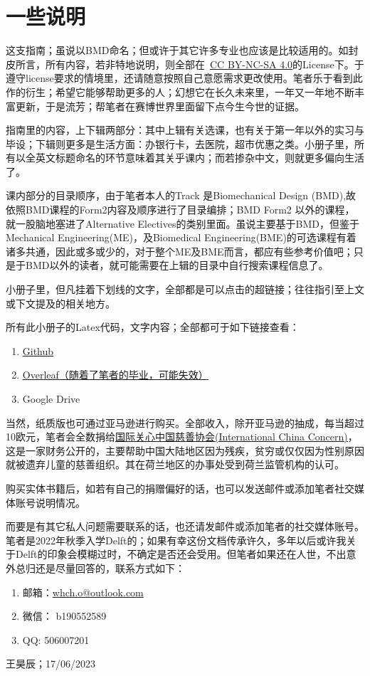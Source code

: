 \section{一些说明}
这支指南；虽说以BMD命名；但或许于其它许多专业也应该是比较适用的。如封皮所言，所有内容，若非特地说明，则全部在\ccbyncsa\ \href{http://creativecommons.org/licenses/by-nc-sa/4.0/}{\uline{CC BY-NC-SA 4.0}}的License下。于遵守license要求的情境里，还请随意按照自己意愿需求更改使用。笔者乐于看到此作的衍生；希望它能够帮助更多的人；幻想它在长久未来里，一年又一年地不断丰富更新，于是流芳；帮笔者在赛博世界里面留下点今生今世的证据。

指南里的内容，上下辑两部分：其中上辑有关选课，也有关于第一年以外的实习与毕设；下辑则更多是生活方面：办银行卡，去医院，超市优惠之类。小册子里，所有以全英文标题命名的环节意味着其关乎课内；而若掺杂中文，则就更多偏向生活了。

课内部分的目录顺序，由于笔者本人的Track 是Biomechanical Design (BMD),故依照BMD课程的Form2内容及顺序进行了目录编排；BMD Form2 以外的课程，就一股脑地塞进了Alternative Electives的类别里面。虽说主要基于BMD，但鉴于Mechanical Engineering(ME)，及Biomedical Engineering(BME)的可选课程有着诸多共通，因此或多或少的，对于整个ME及BME而言，都应有些参考价值吧；只是于BMD以外的读者，就可能需要在上辑的目录中自行搜索课程信息了。

小册子里，但凡挂着下划线的文字，全部都是可以点击的超链接；往往指引至上文或下文提及的相关地方。

所有此小册子的Latex代码，文字内容；全部都可于如下链接查看：
\begin{enumerate}
\item \href{https://github.com/HochanWang/BMD-ZhiNan}{\uline{Github}}
\item \href{https://www.overleaf.com/9181971742xyhrjrdxdzkt}{\uline{Overleaf（随着了笔者的毕业，可能失效）}}
\item Google Drive
\end{enumerate}

当然，纸质版也可通过亚马逊进行购买。全部收入，除开亚马逊的抽成，每当超过10欧元，笔者会全数捐给\href{https://chinaconcern.org/zh_hans/?fbclid=IwAR263C_R6_XiYRZrUrad-3TvXTMNcJAJWlTMwOiNIhiyCmAGR3GjPwBWH0w}{\uline{国际关心中国慈善协会(International China Concern)}}，这是一家财务公开的，主要帮助中国大陆地区因为残疾，贫穷或仅仅因为性别原因就被遗弃儿童的慈善组织。其在荷兰地区的办事处受到荷兰监管机构的认可。

购买实体书籍后，如若有自己的捐赠偏好的话，也可以发送邮件或添加笔者社交媒体账号说明情况。

而要是有其它私人问题需要联系的话，也还请发邮件或添加笔者的社交媒体账号。笔者是2022年秋季入学Delft的；如果有幸这份文档传承许久，多年以后或许我关于Delft的印象会模糊过时，不确定是否还会受用。但笔者如果还在人世，不出意外总归还是尽量回答的，联系方式如下：
\begin{enumerate}
\item 邮箱：\href{mailto:whch.o@outlook.com}{whch.o@outlook.com}
\item 微信： b190552589
\item QQ: 506007201
\end{enumerate}

\begin{flushright}
王昊辰；17/06/2023
\end{flushright}

